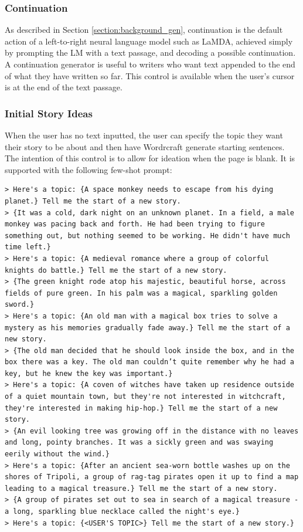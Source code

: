 \subsubsection{Continuation}
As described in Section \ref{section:background_gen}, continuation is the default action of a left-to-right neural language model such as LaMDA, achieved simply by prompting the LM with a text passage, and decoding a possible continuation.
A continuation generator is useful to writers who want text appended to the end of what they have written so far.
This control is available when the user's cursor is at the end of the text passage.

\subsubsection{Initial Story Ideas}
When the user has no text inputted, the user can specify the topic they want their story to be about and then have Wordrcraft generate starting sentences.
The intention of this control is to allow for ideation when the page is blank.
It is supported with the following few-shot prompt:

\begin{verbatim}
> Here's a topic: {A space monkey needs to escape from his dying planet.} Tell me the start of a new story.
> {It was a cold, dark night on an unknown planet. In a field, a male monkey was pacing back and forth. He had been trying to figure something out, but nothing seemed to be working. He didn't have much time left.}
> Here's a topic: {A medieval romance where a group of colorful knights do battle.} Tell me the start of a new story.
> {The green knight rode atop his majestic, beautiful horse, across fields of pure green. In his palm was a magical, sparkling golden sword.}
> Here's a topic: {An old man with a magical box tries to solve a mystery as his memories gradually fade away.} Tell me the start of a new story.
> {The old man decided that he should look inside the box, and in the box there was a key. The old man couldn’t quite remember why he had a key, but he knew the key was important.}
> Here's a topic: {A coven of witches have taken up residence outside of a quiet mountain town, but they're not interested in witchcraft, they're interested in making hip-hop.} Tell me the start of a new story.
> {An evil looking tree was growing off in the distance with no leaves and long, pointy branches. It was a sickly green and was swaying eerily without the wind.}
> Here's a topic: {After an ancient sea-worn bottle washes up on the shores of Tripoli, a group of rag-tag pirates open it up to find a map leading to a magical treasure.} Tell me the start of a new story.
> {A group of pirates set out to sea in search of a magical treasure - a long, sparkling blue necklace called the night's eye.}
> Here's a topic: {<USER'S TOPIC>} Tell me the start of a new story.}
\end{verbatim}

